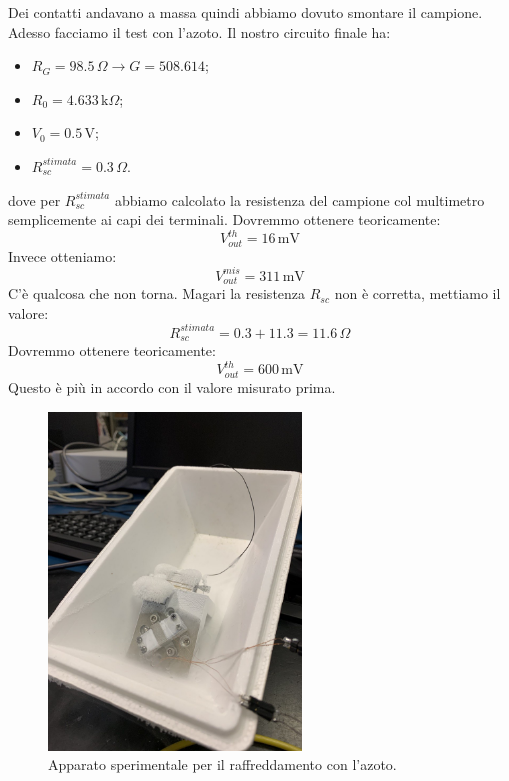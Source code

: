 \documentclass[../main/main.tex]{subfiles}
\begin{document}

Dei contatti andavano a massa quindi abbiamo dovuto smontare il campione.
Adesso facciamo il test con l'azoto. Il nostro circuito finale ha:
\begin{itemize}
\item \( R_{G} = 98.5 \, \Omega  \rightarrow G = 508.614 \);
\item \( R_0 = 4.633 \, \text{k}\Omega  \);
\item \( V_0 = 0.5 \, \text{V} \);
\item \( R_{sc}^{stimata} = 0.3 \,\Omega  \).
\end{itemize}
dove per \( R_{sc}^{stimata} \) abbiamo calcolato la resistenza del campione col multimetro semplicemente ai capi dei terminali.
Dovremmo ottenere teoricamente:
\begin{equation*}
  V_{out}^{th} = 16 \, \text{mV}
\end{equation*}
Invece otteniamo:
\begin{equation*}
  V_{out}^{mis} = 311 \, \text{mV}
\end{equation*}
C'è qualcosa che non torna. Magari la resistenza \( R_{sc} \) non è corretta, mettiamo il valore:
\begin{equation*}
  R_{sc}^{stimata} = 0.3 + 11.3 = 11.6 \,\Omega
\end{equation*}
Dovremmo ottenere teoricamente:
\begin{equation*}
  V_{out}^{th} = 600 \, \text{mV}
\end{equation*}
Questo è più in accordo con il valore misurato prima.

\begin{figure}[h!]
\centering
\includegraphics[width=0.6\textwidth]{../lessons/image/06/1.jpg}
\caption{\label{fig:06_1} Apparato sperimentale per il raffreddamento con l'azoto.}
\end{figure}
\end{document}
